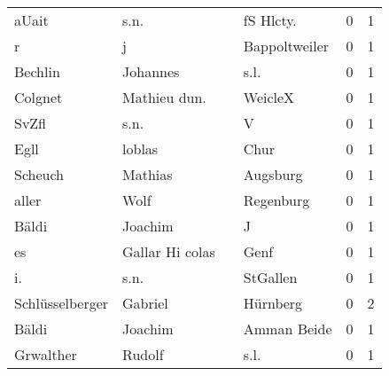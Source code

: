 \begin{center}
\begin{tiny}
\begin{longtabu}{llllrr}
                    aUait &                               s.n. &             &                                  fS Hlcty.  &          0 &         1 \\
                        r &                                  j &             &                               Bappoltweiler &          0 &         1 \\
                  Bechlin &                           Johannes &             &                                        s.l. &          0 &         1 \\
                  Colgnet &                       Mathieu dun. &             &                                     WeicleX &          0 &         1 \\
                    SvZfl &                               s.n. &             &                                           V &          0 &         1 \\
                     Egll &                             loblas &             &                                        Chur &          0 &         1 \\
                  Scheuch &                            Mathias &             &                                    Augsburg &          0 &         1 \\
                    aller &                               Wolf &             &                                   Regenburg &          0 &         1 \\
                    Bäldi &                            Joachim &             &                                           J &          0 &         1 \\
                       es &                    Gallar Hi colas &             &                                        Genf &          0 &         1 \\
                       i. &                               s.n. &             &                                    StGallen &          0 &         1 \\
          Schlüsselberger &                            Gabriel &             &                                    Hürnberg &          0 &         2 \\
                    Bäldi &                            Joachim &             &                                 Amman Beide &          0 &         1 \\
                Grwalther &                             Rudolf &             &                                        s.l. &          0 &         1 \\

\end{longtabu}
\end{tiny}
\end{center}
